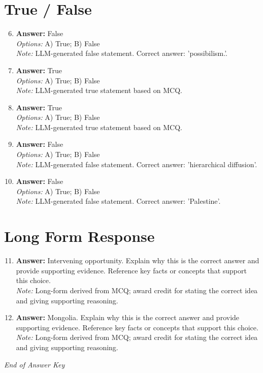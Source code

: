 \documentclass[12pt]{article}
\begin{document}
\section*{True / False}
\begin{enumerate}[label=\arabic*.]
\setcounter{enumi}{5}
\item \textbf{Answer:} False
\\ \textit{Options:} A) True; B) False
\\ \textit{Note:} LLM-generated false statement. Correct answer: 'possibilism.'.
\item \textbf{Answer:} True
\\ \textit{Options:} A) True; B) False
\\ \textit{Note:} LLM-generated true statement based on MCQ.
\item \textbf{Answer:} True
\\ \textit{Options:} A) True; B) False
\\ \textit{Note:} LLM-generated true statement based on MCQ.
\item \textbf{Answer:} False
\\ \textit{Options:} A) True; B) False
\\ \textit{Note:} LLM-generated false statement. Correct answer: 'hierarchical diffusion'.
\item \textbf{Answer:} False
\\ \textit{Options:} A) True; B) False
\\ \textit{Note:} LLM-generated false statement. Correct answer: 'Palestine'.
\end{enumerate}

\section*{Long Form Response}
\begin{enumerate}[label=\arabic*.]
\setcounter{enumi}{10}
\item \textbf{Answer:} Intervening opportunity. Explain why this is the correct answer and provide supporting evidence. Reference key facts or concepts that support this choice.
\\ \textit{Note:} Long-form derived from MCQ; award credit for stating the correct idea and giving supporting reasoning.
\item \textbf{Answer:} Mongolia. Explain why this is the correct answer and provide supporting evidence. Reference key facts or concepts that support this choice.
\\ \textit{Note:} Long-form derived from MCQ; award credit for stating the correct idea and giving supporting reasoning.
\end{enumerate}

\vfill
\noindent\textit{End of Answer Key}
\end{document}
